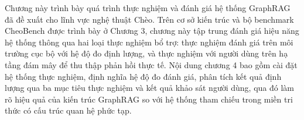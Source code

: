 
Chương này trình bày quá trình thực nghiệm và đánh giá hệ thống GraphRAG đã đề xuất cho lĩnh vực nghệ thuật Chèo. Trên cơ sở kiến trúc và bộ benchmark CheoBench được trình bày ở Chương 3, chương này tập trung đánh giá hiệu năng hệ thống thông qua hai loại thực nghiệm bổ trợ: thực nghiệm đánh giá trên môi trường cục bộ với hệ độ đo định lượng, và thực nghiệm với người dùng trên hạ tầng đám mây để thu thập phản hồi thực tế. Nội dung chương 4 bao gồm cài đặt hệ thống thực nghiệm, định nghĩa hệ độ đo đánh giá, phân tích kết quả định lượng qua ba mục tiêu thực nghiệm và kết quả khảo sát người dùng, qua đó làm rõ hiệu quả của kiến trúc GraphRAG so với hệ thống tham chiếu trong miền tri thức có cấu trúc quan hệ phức tạp.
